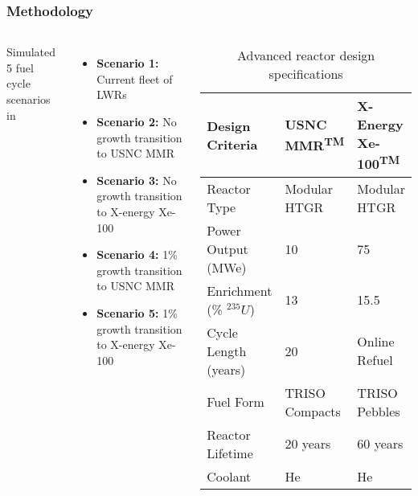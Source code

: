\begin{frame}
    \frametitle{Methodology}
    \begin{columns}
        \column[t]{5cm}
        Simulated 5 fuel cycle scenarios in \Cyclus \cite{huff_fundamental_2016}
    \begin{itemize}
        \item \textbf{Scenario 1:} Current fleet of \glspl{LWR}
        \item \textbf{Scenario 2:} No growth transition to \gls{USNC} \gls{MMR}
        \item \textbf{Scenario 3:} No growth transition to X-energy Xe-100
        \item \textbf{Scenario 4:} 1\% growth transition to \gls{USNC} \gls{MMR}
        \item \textbf{Scenario 5:} 1\% growth transition to X-energy Xe-100
    \end{itemize}

    \column[t]{5cm}
    \begingroup
        \renewcommand{\arraystretch}{1.5} %
        \begin{table}[t!]
            \tiny
            \caption{Advanced reactor design specifications}
            \label{tab:reactor_summary}
            \begin{tabular}{ p{1.5cm} p{1.5cm} p{1.25cm}}
                \hline
                Design Criteria & \gls{USNC} \gls{MMR}\textsuperscript{TM} & 
                    X-Energy Xe-100\textsuperscript{TM} \\\hline
                
                Reactor Type & Modular HTGR & Modular HTGR \\
                Power Output (MWe) & 10 & 75 \\
                Enrichment (\% $^{235}U$) & 13 & 15.5 \\
                Cycle Length (years) & 20 & Online Refuel\\
                Fuel Form & TRISO Compacts & TRISO Pebbles\\
                Reactor Lifetime & 20 years & 60 years \\
                Coolant & He & He \\
                \hline
            \end{tabular}
        \end{table}   
        \endgroup
    \end{columns}
\end{frame}

